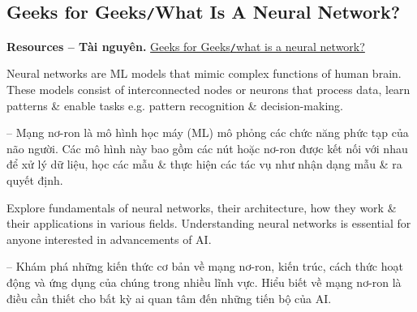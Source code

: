 \documentclass{article}
\begin{document}

\subsection{Geeks for Geeks{\tt/}What Is A Neural Network?}
\textbf{\textsf{Resources -- Tài nguyên.}} \href{https://www.geeksforgeeks.org/machine-learning/neural-networks-a-beginners-guide/}{Geeks for Geeks{\tt/}what is a neural network?}

Neural networks are ML models that mimic complex functions of human brain. These models consist of interconnected nodes or neurons that process data, learn patterns \& enable tasks e.g. pattern recognition \& decision-making.

-- Mạng nơ-ron là mô hình học máy (ML) mô phỏng các chức năng phức tạp của não người. Các mô hình này bao gồm các nút hoặc nơ-ron được kết nối với nhau để xử lý dữ liệu, học các mẫu \& thực hiện các tác vụ như nhận dạng mẫu \& ra quyết định.

Explore fundamentals of neural networks, their architecture, how they work \& their applications in various fields. Understanding neural networks is essential for anyone interested in advancements of AI.

-- Khám phá những kiến thức cơ bản về mạng nơ-ron, kiến trúc, cách thức hoạt động và ứng dụng của chúng trong nhiều lĩnh vực. Hiểu biết về mạng nơ-ron là điều cần thiết cho bất kỳ ai quan tâm đến những tiến bộ của AI.

\end{document}
